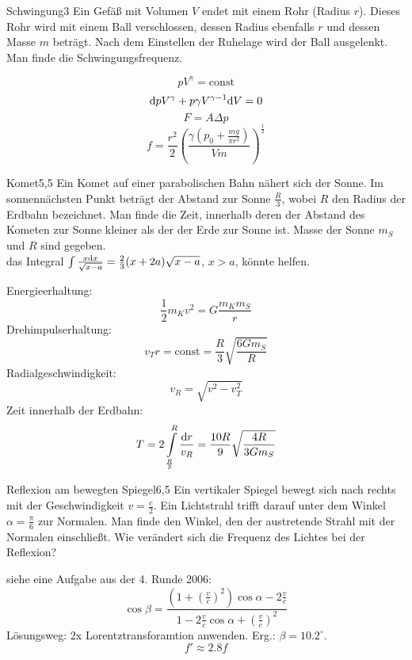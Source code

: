 \begin{problem}{Schwingung}{3}
Ein Gefäß mit Volumen $V$ endet mit einem Rohr (Radius $r$). Dieses Rohr wird mit einem Ball verschlossen, dessen Radius ebenfalls $r$ und dessen Masse $m$ beträgt. Nach dem Einstellen der Ruhelage wird der Ball ausgelenkt. Man finde die Schwingungsfrequenz.
\begin{solution}
\[
pV^\gamma =\mathrm{const}
\]
\[
\mathrm{d} p V^\gamma + p \gamma V^{\gamma-1} \mathrm{d} V=0
\]
\[
F=A \Delta p
\]
\[
f=\frac{r^2}{2}\left( \frac{\gamma (p_0+\frac{mg}{\pi r^2})}{Vm} \right)^{\frac 12}
\]
\end{solution}
\end{problem}

\begin{problem}{Komet}{5,5}
Ein Komet auf einer parabolischen Bahn nähert sich der Sonne. Im sonnennächsten Punkt beträgt der Abstand zur Sonne $\frac R3$, wobei $R$ den Radius der Erdbahn bezeichnet. Man finde die Zeit, innerhalb deren der Abstand des Kometen zur Sonne kleiner als der der Erde zur Sonne ist. Masse der Sonne $m_S$ und $R$ sind gegeben.\\
\hinweis das Integral $\int \frac{x \mathrm{d} x}{\sqrt{x-a}}=\frac 23 (x+2a) \sqrt{x-a}$, $x>a$, könnte helfen.
\begin{solution}
Energieerhaltung:
\[
\frac 12 m_K v^2=G \frac{m_K m_S}{r}
\]
Drehimpulserhaltung:
\[
v_T r=\mathrm{const}=\frac{R}{3}\sqrt{\frac{6 G m_S}{R}}
\]
Radialgeschwindigkeit:
\[
v_R=\sqrt{v^2-v_T^2}
\]
Zeit innerhalb der Erdbahn:
\[
T=2 \int\limits_\frac R3^R \frac{\mathrm{d} r}{v_R}=\frac{10 R}{9} \sqrt{\frac{4 R}{3 G m_S}}
\]
\end{solution}
\end{problem}

\begin{problem}{Reflexion am bewegten Spiegel}{6,5}
Ein vertikaler Spiegel bewegt sich nach rechts mit der Geschwindigkeit $v=\frac c2$. Ein Lichtstrahl trifft darauf unter dem Winkel $\alpha=\frac \pi 6$ zur Normalen. Man finde den Winkel, den der austretende Strahl mit der Normalen einschließt. Wie verändert sich die Frequenz des Lichtes bei der Reflexion?
\begin{solution}
siehe eine Aufgabe aus der 4. Runde 2006:
\[
\cos\beta=\frac{(1+(\frac{v}{c})^2)\cos\alpha-2\frac{v}{c}}{1-2\frac{v}{c}\cos\alpha+(\frac{v}{c})^2}
\]
Lösungsweg: 2x Lorentztransforamtion anwenden. Erg.: $\beta=10.2^\circ$.
\[
f' \approx 2.8 f
\]
\end{solution}
\end{problem}

